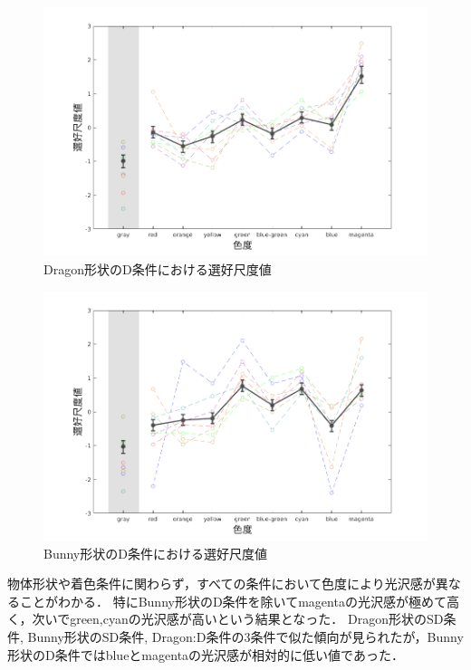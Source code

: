         \begin{figure}[h]
            \centering
            \includegraphics[width=14.0cm]{./img/ex1_res_DD_p.png}
            \caption{Dragon形状のD条件における選好尺度値}
            \label{ex1_DD}
        \end{figure}

        \begin{figure}[h]
            \centering
            \includegraphics[width=14.0cm]{./img/ex1_res_BD_p.png}
            \caption{Bunny形状のD条件における選好尺度値}
            \label{ex1_BD}
        \end{figure}

        物体形状や着色条件に関わらず，すべての条件において色度により光沢感が異なることがわかる．
        特にBunny形状のD条件を除いてmagentaの光沢感が極めて高く，次いでgreen,cyanの光沢感が高いという結果となった．
        Dragon形状のSD条件, Bunny形状のSD条件, Dragon:D条件の3条件で似た傾向が見られたが，Bunny形状のD条件ではblueとmagentaの光沢感が相対的に低い値であった．

